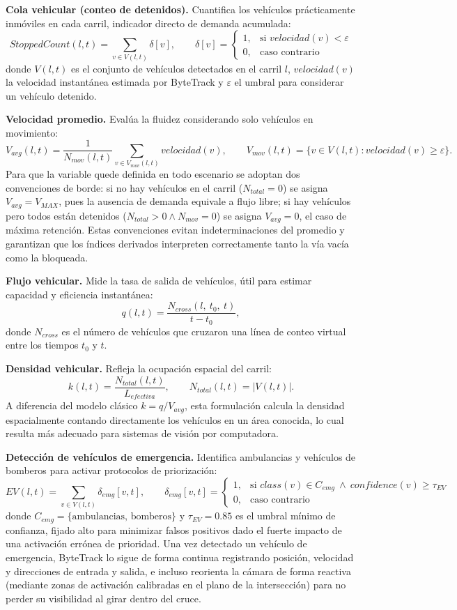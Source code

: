 \textbf{Cola vehicular (conteo de detenidos).} Cuantifica los vehículos prácticamente
inmóviles en cada carril, indicador directo de demanda acumulada:
\[
StoppedCount(l,t) = \sum_{v \in V(l,t)}\delta[v],
\qquad
\delta[v] =
\begin{cases}
1, & \text{si } velocidad(v) < \varepsilon\\[2pt]
0, & \text{caso contrario}
\end{cases}
\]
donde $V(l,t)$ es el conjunto de vehículos detectados en el carril $l$, $velocidad(v)$ la
velocidad instantánea estimada por ByteTrack y $\varepsilon$ el umbral para considerar un
vehículo detenido.

\textbf{Velocidad promedio.} Evalúa la fluidez considerando solo vehículos en movimiento:
\[
V_{avg}(l,t) = \frac{1}{N_{mov}(l,t)}\sum_{v \in V_{mov}(l,t)}velocidad(v),
\qquad
V_{mov}(l,t) = \{ v \in V(l,t): velocidad(v) \geq \varepsilon\}.
\]
Para que la variable quede definida en todo escenario se adoptan dos convenciones de borde: si
no hay vehículos en el carril ($N_{total}=0$) se asigna $V_{avg}=V_{MAX}$, pues la ausencia de
demanda equivale a flujo libre; si hay vehículos pero todos están detenidos
($N_{total}>0 \land N_{mov}=0$) se asigna $V_{avg}=0$, el caso de máxima retención. Estas
convenciones evitan indeterminaciones del promedio y garantizan que los índices derivados
interpreten correctamente tanto la vía vacía como la bloqueada.

\textbf{Flujo vehicular.} Mide la tasa de salida de vehículos, útil para estimar capacidad y
eficiencia instantánea:
\[
q(l,t) = \frac{N_{cross}(l,\ t_{0},\ t)}{t-t_{0}},
\]
donde $N_{cross}$ es el número de vehículos que cruzaron una línea de conteo virtual entre los
tiempos $t_{0}$ y $t$.

\textbf{Densidad vehicular.} Refleja la ocupación espacial del carril:
\[
k(l,t) = \frac{N_{total}(l,t)}{L_{efectiva}},
\qquad N_{total}(l,t)=|V(l,t)|.
\]
A diferencia del modelo clásico $k=q/V_{avg}$, esta formulación calcula la densidad
espacialmente contando directamente los vehículos en un área conocida, lo cual resulta más
adecuado para sistemas de visión por computadora.

\textbf{Detección de vehículos de emergencia.} Identifica ambulancias y vehículos de bomberos
para activar protocolos de priorización:
\[
EV(l,t) = \sum_{v \in V(l,t)}\delta_{emg}[v,t],
\qquad
\delta_{emg}[v,t] =
\begin{cases}
1, & \text{si } class(v)\in C_{emg}\ \land\ confidence(v)\geq \tau_{EV}\\[2pt]
0, & \text{caso contrario}
\end{cases}
\]
donde $C_{emg}=\{\text{ambulancias, bomberos}\}$ y $\tau_{EV}=0.85$ es el umbral mínimo de
confianza, fijado alto para minimizar falsos positivos dado el fuerte impacto de una
activación errónea de prioridad. Una vez detectado un vehículo de emergencia, ByteTrack lo
sigue de forma continua registrando posición, velocidad y direcciones de entrada y salida, e
incluso reorienta la cámara de forma reactiva (mediante zonas de activación calibradas en el
plano de la intersección) para no perder su visibilidad al girar dentro del cruce.

